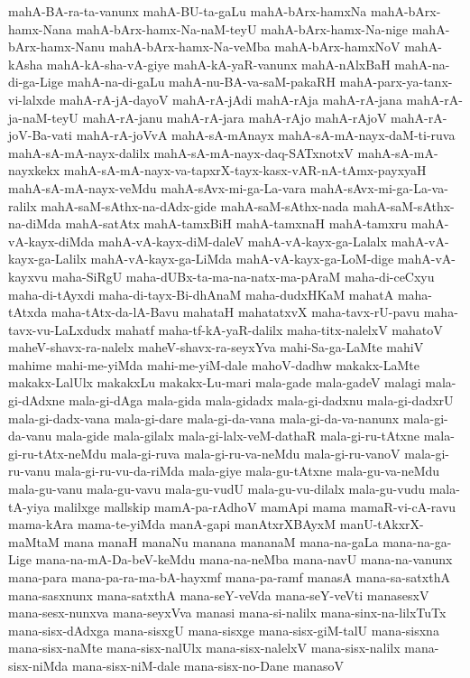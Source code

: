 {mahA-BA-ra-ta-vanunx
mahA-BU-ta-gaLu
mahA-bArx-hamxNa
mahA-bArx-hamx-Nana
mahA-bArx-hamx-Na-naM-teyU
mahA-bArx-hamx-Na-nige
mahA-bArx-hamx-Nanu
mahA-bArx-hamx-Na-veMba
mahA-bArx-hamxNoV
mahA-kAsha
mahA-kA-sha-vA-giye
mahA-kA-yaR-vanunx
mahA-nAlxBaH
mahA-na-di-ga-Lige
mahA-na-di-gaLu
mahA-nu-BA-va-saM-pakaRH
mahA-parx-ya-tanx-vi-lalxde
mahA-rA-jA-dayoV
mahA-rA-jAdi
mahA-rAja
mahA-rA-jana
mahA-rA-ja-naM-teyU
mahA-rA-janu
mahA-rA-jara
mahA-rAjo
mahA-rAjoV
mahA-rA-joV-Ba-vati
mahA-rA-joVvA
mahA-sA-mAnayx
mahA-sA-mA-nayx-daM-ti-ruva
mahA-sA-mA-nayx-dalilx
mahA-sA-mA-nayx-daq-SATxnotxV
mahA-sA-mA-nayxkekx
mahA-sA-mA-nayx-va-tapxrX-tayx-kasx-vAR-nA-tAmx-payxyaH
mahA-sA-mA-nayx-veMdu
mahA-sAvx-mi-ga-La-vara
mahA-sAvx-mi-ga-La-va-ralilx
mahA-saM-sAthx-na-dAdx-gide
mahA-saM-sAthx-nada
mahA-saM-sAthx-na-diMda
mahA-satAtx
mahA-tamxBiH
mahA-tamxnaH
mahA-tamxru
mahA-vA-kayx-diMda
mahA-vA-kayx-diM-daleV
mahA-vA-kayx-ga-Lalalx
mahA-vA-kayx-ga-Lalilx
mahA-vA-kayx-ga-LiMda
mahA-vA-kayx-ga-LoM-dige
mahA-vA-kayxvu
maha-SiRgU
maha-dUBx-ta-ma-na-natx-ma-pAraM
maha-di-ceCxyu
maha-di-tAyxdi
maha-di-tayx-Bi-dhAnaM
maha-dudxHKaM
mahatA
maha-tAtxda
maha-tAtx-da-lA-Bavu
mahataH
mahatatxvX
maha-tavx-rU-pavu
maha-tavx-vu-LaLxdudx
mahatf
maha-tf-kA-yaR-dalilx
maha-titx-nalelxV
mahatoV
maheV-shavx-ra-nalelx
maheV-shavx-ra-seyxYva
mahi-Sa-ga-LaMte
mahiV
mahime
mahi-me-yiMda
mahi-me-yiM-dale
mahoV-dadhw
makakx-LaMte
makakx-LalUlx
makakxLu
makakx-Lu-mari
mala-gade
mala-gadeV
malagi
mala-gi-dAdxne
mala-gi-dAga
mala-gida
mala-gidadx
mala-gi-dadxnu
mala-gi-dadxrU
mala-gi-dadx-vana
mala-gi-dare
mala-gi-da-vana
mala-gi-da-va-nanunx
mala-gi-da-vanu
mala-gide
mala-gilalx
mala-gi-lalx-veM-dathaR
mala-gi-ru-tAtxne
mala-gi-ru-tAtx-neMdu
mala-gi-ruva
mala-gi-ru-va-neMdu
mala-gi-ru-vanoV
mala-gi-ru-vanu
mala-gi-ru-vu-da-riMda
mala-giye
mala-gu-tAtxne
mala-gu-va-neMdu
mala-gu-vanu
mala-gu-vavu
mala-gu-vudU
mala-gu-vu-dilalx
mala-gu-vudu
mala-tA-yiya
malilxge
mallskip
mamA-pa-rAdhoV
mamApi
mama
mamaR-vi-cA-ravu
mama-kAra
mama-te-yiMda
manA-gapi
manAtxrXBAyxM
manU-tAkxrX-maMtaM
mana
manaH
manaNu
manana
mananaM
mana-na-gaLa
mana-na-ga-Lige
mana-na-mA-Da-beV-keMdu
mana-na-neMba
mana-navU
mana-na-vanunx
mana-para
mana-pa-ra-ma-bA-hayxmf
mana-pa-ramf
manasA
mana-sa-satxthA
mana-sasxnunx
mana-satxthA
mana-seY-veVda
mana-seY-veVti
manasesxV
mana-sesx-nunxva
mana-seyxVva
manasi
mana-si-nalilx
mana-sinx-na-lilxTuTx
mana-sisx-dAdxga
mana-sisxgU
mana-sisxge
mana-sisx-giM-talU
mana-sisxna
mana-sisx-naMte
mana-sisx-nalUlx
mana-sisx-nalelxV
mana-sisx-nalilx
mana-sisx-niMda
mana-sisx-niM-dale
mana-sisx-no-Dane
manasoV
}
